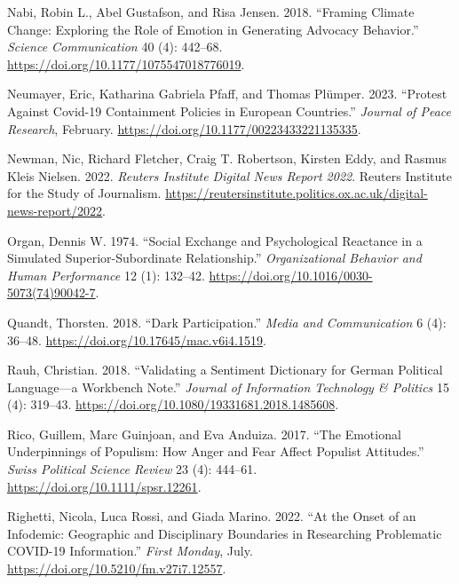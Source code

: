 \documentclass[
]{ccr}
\newlength{\cslhangindent}
\newlength{\cslentryspacingunit} %
\newenvironment{CSLReferences}[2] %
 {%
  \setlength{\parindent}{0pt}
  \ifodd #1
  \let\oldpar\par
  \def\par{\hangindent=\cslhangindent\oldpar}
  \fi
  \setlength{\parskip}{#2\cslentryspacingunit}
 }%
 {}
\begin{document}
\begin{CSLReferences}{1}{0}
\leavevmode{}%
Nabi, Robin L., Abel Gustafson, and Risa Jensen. 2018. {``Framing
{Climate Change}: {Exploring} the {Role} of {Emotion} in {Generating
Advocacy Behavior}.''} \emph{Science Communication} 40 (4): 442--68.
\url{https://doi.org/10.1177/1075547018776019}.

\leavevmode{}%
Neumayer, Eric, Katharina Gabriela Pfaff, and Thomas Plümper. 2023.
{``Protest Against {Covid-19} Containment Policies in {European}
Countries.''} \emph{Journal of Peace Research}, February.
\url{https://doi.org/10.1177/00223433221135335}.

\leavevmode{}%
Newman, Nic, Richard Fletcher, Craig T. Robertson, Kirsten Eddy, and
Rasmus Kleis Nielsen. 2022. \emph{Reuters Institute Digital News Report
2022}. {Reuters Institute for the Study of Journalism}.
\url{https://reutersinstitute.politics.ox.ac.uk/digital-news-report/2022}.

\leavevmode{}%
Organ, Dennis W. 1974. {``Social Exchange and Psychological Reactance in
a Simulated Superior-Subordinate Relationship.''} \emph{Organizational
Behavior and Human Performance} 12 (1): 132--42.
\url{https://doi.org/10.1016/0030-5073(74)90042-7}.

\leavevmode{}%
Quandt, Thorsten. 2018. {``Dark Participation.''} \emph{Media and
Communication} 6 (4): 36--48.
\url{https://doi.org/10.17645/mac.v6i4.1519}.

\leavevmode{}%
Rauh, Christian. 2018. {``Validating a Sentiment Dictionary for {German}
Political Language---a Workbench Note.''} \emph{Journal of Information
Technology \& Politics} 15 (4): 319--43.
\url{https://doi.org/10.1080/19331681.2018.1485608}.

\leavevmode{}%
Rico, Guillem, Marc Guinjoan, and Eva Anduiza. 2017. {``The {Emotional
Underpinnings} of {Populism}: {How Anger} and {Fear Affect Populist
Attitudes}.''} \emph{Swiss Political Science Review} 23 (4): 444--61.
\url{https://doi.org/10.1111/spsr.12261}.

\leavevmode{}%
Righetti, Nicola, Luca Rossi, and Giada Marino. 2022. {``At the Onset of
an Infodemic: {Geographic} and Disciplinary Boundaries in Researching
Problematic {COVID-19} Information.''} \emph{First Monday}, July.
\url{https://doi.org/10.5210/fm.v27i7.12557}.


\end{CSLReferences}
\end{document}

